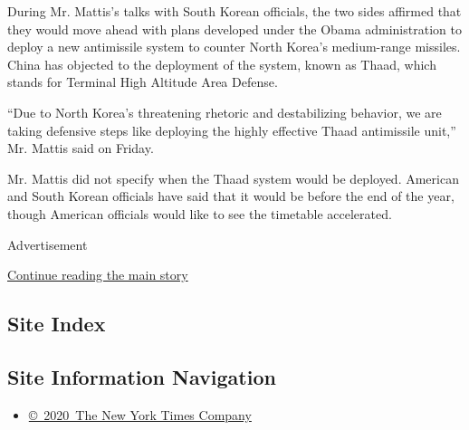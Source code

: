 During Mr. Mattis's talks with South Korean officials, the two sides
affirmed that they would move ahead with plans developed under the Obama
administration to deploy a new antimissile system to counter North
Korea's medium-range missiles. China has objected to the deployment of
the system, known as Thaad, which stands for Terminal High Altitude Area
Defense.

``Due to North Korea's threatening rhetoric and destabilizing behavior,
we are taking defensive steps like deploying the highly effective Thaad
antimissile unit,'' Mr. Mattis said on Friday.

Mr. Mattis did not specify when the Thaad system would be deployed.
American and South Korean officials have said that it would be before
the end of the year, though American officials would like to see the
timetable accelerated.

Advertisement

\protect\hyperlink{after-bottom}{Continue reading the main story}

\hypertarget{site-index}{%
\subsection{Site Index}\label{site-index}}

\hypertarget{site-information-navigation}{%
\subsection{Site Information
Navigation}\label{site-information-navigation}}

\begin{itemize}
\tightlist
\item
  \href{https://help.nytimes3xbfgragh.onion/hc/en-us/articles/115014792127-Copyright-notice}{©~2020~The
  New York Times Company}
\end{itemize}

